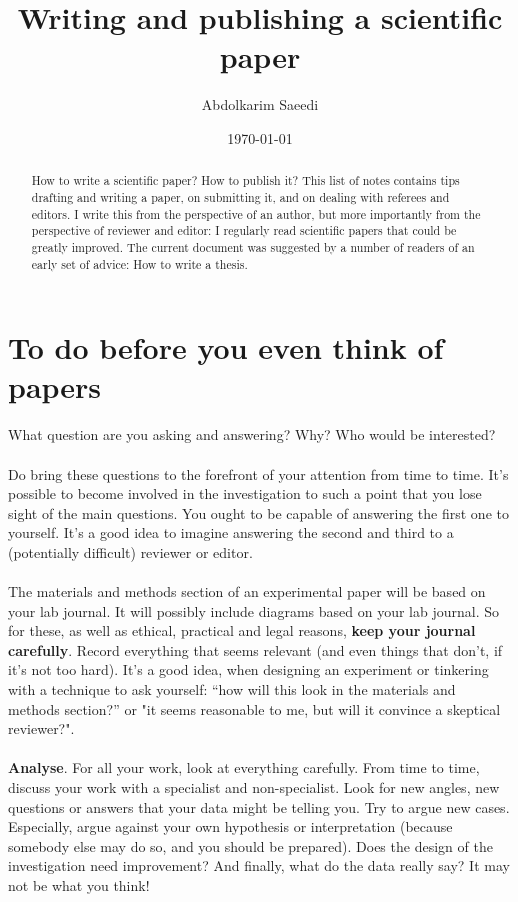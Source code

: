 \documentclass[a4paper,12pt]{article}
\begin{document}
\title{Writing and publishing a scientific paper}
\author{Abdolkarim Saeedi}
\date{\today}
\maketitle
\begin{abstract}
How to write a scientific paper? How to publish it? This list of notes contains tips drafting and writing a paper, on submitting it, and on dealing with referees and editors. I write this from the perspective of an author, but more importantly from the perspective of reviewer and editor: I regularly read scientific papers that could be greatly improved. The current document was suggested by a number of readers of an early set of advice: How to write a thesis.
\end{abstract}
\newpage
\tableofcontents
\newpage
\section{To do before you even think of papers}
What question are you asking and answering? Why? Who would be interested?\\\\Do bring these questions to the forefront of your attention from time to time. It's possible to become involved in the investigation to such a point that you lose sight of the main questions. You ought to be capable of answering the first one to yourself. It's a good idea to imagine answering the second and third to a (potentially difficult) reviewer or editor.\\\\The materials and methods section of an experimental paper will be based on your lab journal. It will possibly include diagrams based on your lab journal. So for these, as well as ethical, practical and legal reasons, \textbf{keep your journal carefully}. Record everything that seems relevant (and even things that don't, if it's not too hard). It’s a good idea, when designing an experiment or tinkering with a technique to ask yourself: “how will this look in the materials and methods section?” or "it seems reasonable to me, but will it convince a skeptical reviewer?".\\\\\textbf{Analyse}. For all your work, look at everything carefully. From time to time, discuss your work with a specialist and non-specialist. Look for new angles, new questions or answers that your data might be telling you. Try to argue new cases. Especially, argue against your own hypothesis or interpretation (because somebody else may do so, and you should be prepared). Does the design of the investigation need improvement? And finally, what do the data really say? It may not be what you think!
\end{document}
